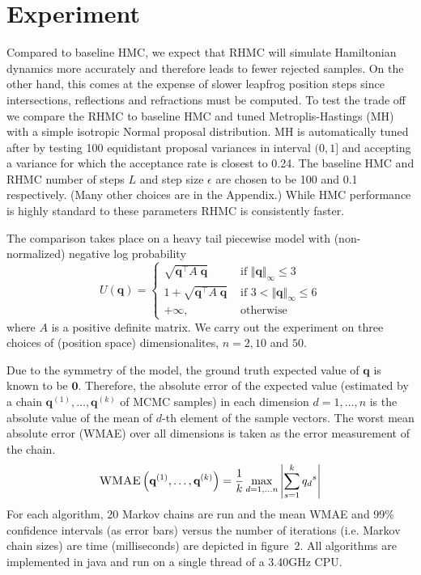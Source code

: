 \documentclass{article} %
\newcommand{\bvec}[1]{\textbf{#1}}
\newcommand{\case}[2]{#2 &\text{ if } #1}%
\newcommand{\otherwise}[1]{#1 &\text{ otherwise}}
\begin{document}
\section{Experiment} \label{sect:example}
Compared to baseline HMC, we expect that RHMC will simulate Hamiltonian dynamics more accurately and therefore leads to fewer rejected samples.  On the other hand, this comes at the expense of slower leapfrog position steps since intersections, reflections and refractions must be computed. To test the trade off we    
compare the RHMC to baseline HMC \cite{neal2011mcmc} and tuned Metroplis-Hastings (MH) with a simple isotropic Normal proposal distribution.  MH is automatically tuned after \cite{roberts1997weak} by testing 100 equidistant proposal variances in interval $(0, 1]$ and accepting a variance for which the acceptance rate is closest to 0.24.
The baseline HMC and RHMC number of steps $L$ and step size $\epsilon$ are chosen to be 100 and 0.1 respectively. (Many other choices are in the Appendix.) While HMC performance is highly standard to these parameters \cite{homan2014no} RHMC is consistently faster.

The comparison takes place on a heavy tail piecewise model with (non-normalized) negative log probability  
\[
U(\bvec{q}) =
\begin{cases}
\case{\Vert \bvec{q} \Vert_\infty \leq 3}{\sqrt{\bvec{q}^\top A \; \bvec{q}}}\\
\case{3 < \Vert \bvec{q} \Vert_\infty \leq 6 }{1 + \sqrt{\bvec{q}^\top A \; \bvec{q}}}\\
\otherwise{+ \infty,}
\end{cases}
\label{eq:Uq}
\] 
where $A$ is a positive definite matrix.  We carry out the experiment on three choices of (position space) dimensionalites,  $n = 2, 10$ and $50$.


Due to the symmetry of the model, the ground truth expected value of $\bvec{q}$ is known to be $\bvec{0}$.
Therefore, the absolute error of the expected value (estimated by a chain $\bvec{q}^{(1)}, \ldots, \bvec{q}^{(k)}$ of MCMC samples) in each dimension $d = 1, \ldots, n$ is 
the absolute value of the mean of $d$-th element of the sample vectors.
The worst mean absolute error (WMAE) over all dimensions is taken as the error measurement of the chain.
\[
\textsc{WMAE} \left( \bvec{q}^{(1)}, \ldots, \bvec{q}^{(k)} \right) = \frac{1}{k}
\max_{d=1, \ldots n} 
\left|\sum_{s=1}^k {q_d}^{s} \right|
\label{eq:WMAE}
\]
For each algorithm, 20 Markov chains are run and the mean WMAE and 99\% confidence intervals (as error bars) versus the number of iterations (i.e. Markov chain sizes) are time (milliseconds) are depicted in 
figure~2. All algorithms are implemented in java and run on a single thread of a 3.40GHz CPU.
\end{document}
